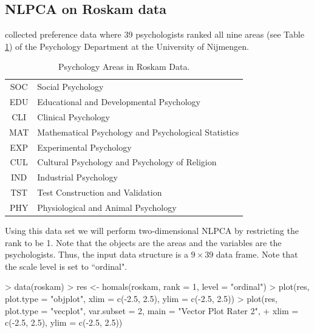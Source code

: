 \documentclass[article]{jss1}
\begin{document}
\subsection{NLPCA on Roskam data}
\label{sec:pcex}
\citet{Roskam:68} collected preference data where 39 psychologists ranked all nine areas (see Table \ref{tab:area}) of the Psychology Department at the University of Nijmengen. 

\begin{table}[ht]
\centering
\begin{tabular}{|c|l|}
\hline
SOC& Social Psychology\\
EDU& Educational and Developmental Psychology\\
CLI& Clinical Psychology\\
MAT& Mathematical Psychology and Psychological Statistics\\
EXP& Experimental Psychology\\
CUL& Cultural Psychology and Psychology of Religion\\
IND& Industrial Psychology\\
TST& Test Construction and Validation\\
PHY& Physiological and Animal Psychology\\
\hline
\end{tabular}
\caption{\label{tab:area}Psychology Areas in Roskam Data.}
\end{table}

Using this data set we will perform two-dimensional NLPCA by restricting the rank to be 1. Note that the objects are the areas and the variables are the psychologists. Thus, the input data structure is a $9 \times 39$ data frame. Note that the scale level is set to ``ordinal".

\begin{Schunk}
\begin{Sinput}
> data(roskam)
> res <- homals(roskam, rank = 1, level = "ordinal")
> plot(res, plot.type = "objplot", xlim = c(-2.5, 2.5), ylim = c(-2.5, 2.5))
> plot(res, plot.type = "vecplot", var.subset = 2, main = "Vector Plot Rater 2",
+ xlim = c(-2.5, 2.5), ylim = c(-2.5, 2.5))
\end{Sinput}
\end{Schunk}
\end{document}

